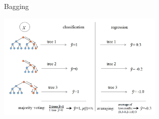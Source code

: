 \documentclass[11pt,compress,t,notes=noshow, xcolor=table]{beamer}
\begin{document}
\begin{vbframe}{Bagging}
\begin{center}
\includegraphics[width=0.6\textwidth]{figure_man/rf_majvot_averaging.png}
\end{center}
\end{vbframe}

\end{document}

